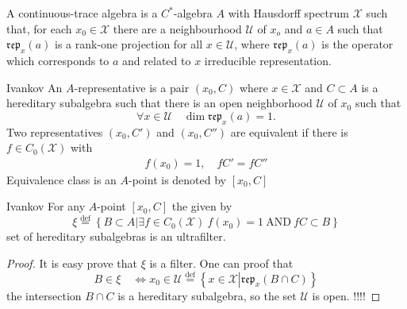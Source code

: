 \documentclass{beamer}
\theoremstyle{plain}
\newcommand{\bean}{\begin{eqnarray*}}
\newcommand{\eean}{\end{eqnarray*}}
\newcommand{\rep}{\mathfrak{rep}}
\newcommand{\sU}{\mathcal{U}}       %
\newcommand{\sX}{\mathcal{X}}       %
\newcommand{\bydef}{\stackrel{\mathrm{def}}{=}}
\begin{document}
\begin{frame}
	\begin{definition}\label{continuous_trace_c_alt_defn}
		A \alert{continuous-trace algebra} is a $C^*$-algebra $A$ with Hausdorff
		spectrum $\sX$ such that, for each $x_0\in\sX$ there are a neighbourhood $\sU$ of $x_o$ and $a\in A$ such that $\rep_{ x}\left( a\right) $ is a rank-one projection for all $x \in \sU$, where $\rep_{ x}\left( a\right) $ is the operator which corresponds to $a$ and related to $x$ irreducible representation.
	\end{definition}
\begin{definition}\alert{Ivankov}
 An $A$-\alert{representative} is a pair $\left(x_0, C \right)$ where $x \in \sX$ and $C\subset A$ is a hereditary subalgebra such that there is an open neighborhood $\sU$ of $x_0$ such that
 $$
 \forall x \in \sU \quad \dim \rep_{ x}\left( a\right) = 1.
 $$
 Two representatives $\left(x_0, C' \right)$ and $\left(x_0, C'' \right)$ are equivalent if there is $f \in C_0\left( \sX\right)$ with
 \bean
 f\left( x_0\right) = 1, \quad  fC' = f C''
 \eean 
Equivalence class is an $A$-\alert{point} is denoted by $\left[x_0, C \right]$
\end{definition}	
\end{frame}
\begin{frame}
	\begin{lemma}\alert{Ivankov}
For any $A$-point $\left[x_0, C \right]$ the given by
$$
\xi \bydef\left\{B \subset A\left| \exists f \in C_0\left( \sX\right) ~ f\left( x_0\right) = 1 ~ \mathrm{AND}~ fC \subset B \right.\right\}
$$
set of hereditary subalgebras is an ultrafilter.
\end{lemma}
\begin{proof}
	It is easy prove that $\xi$ is a filter.
One can proof that 
$$
B \in \xi \quad \Leftrightarrow x_0 \in\sU \bydef \left\{x \in \sX \left|  \rep_x\left(B\cap C \right) \right.\right\}
$$
the intersection $B\cap C$ is a hereditary subalgebra, so the set $\sU$ is open. !!!!
\end{proof}

\end{frame}
\end{document}
